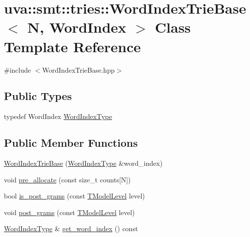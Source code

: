\hypertarget{classuva_1_1smt_1_1tries_1_1_word_index_trie_base}{}\section{uva\+:\+:smt\+:\+:tries\+:\+:Word\+Index\+Trie\+Base$<$ N, Word\+Index $>$ Class Template Reference}
\label{classuva_1_1smt_1_1tries_1_1_word_index_trie_base}


{\ttfamily \#include $<$Word\+Index\+Trie\+Base.\+hpp$>$}

\subsection*{Public Types}
\begin{DoxyCompactItemize}
\item 
typedef Word\+Index \hyperlink{classuva_1_1smt_1_1tries_1_1_word_index_trie_base_a30c4fffe3a3423c87b229b66340dd2f8}{Word\+Index\+Type}
\end{DoxyCompactItemize}
\subsection*{Public Member Functions}
\begin{DoxyCompactItemize}
\item 
\hyperlink{classuva_1_1smt_1_1tries_1_1_word_index_trie_base_afd4bb660c032fbf012fac98fa89d10f6}{Word\+Index\+Trie\+Base} (\hyperlink{classuva_1_1smt_1_1tries_1_1_word_index_trie_base_a30c4fffe3a3423c87b229b66340dd2f8}{Word\+Index\+Type} \&word\+\_\+index)
\item 
void \hyperlink{classuva_1_1smt_1_1tries_1_1_word_index_trie_base_a7481d7ffb51e7f7da90402a1c0ff5cb8}{pre\+\_\+allocate} (const size\+\_\+t counts\mbox{[}N\mbox{]})
\item 
bool \hyperlink{classuva_1_1smt_1_1tries_1_1_word_index_trie_base_a6f4a5a898fc21351a2f41ff951fa4aea}{is\+\_\+post\+\_\+grams} (const \hyperlink{namespaceuva_1_1smt_1_1tries_a20577a44b3a42d26524250634379b7cb}{T\+Model\+Level} level)
\item 
void \hyperlink{classuva_1_1smt_1_1tries_1_1_word_index_trie_base_af2e97e26840915382281d6e13eaef383}{post\+\_\+grams} (const \hyperlink{namespaceuva_1_1smt_1_1tries_a20577a44b3a42d26524250634379b7cb}{T\+Model\+Level} level)
\item 
\hyperlink{classuva_1_1smt_1_1tries_1_1_word_index_trie_base_a30c4fffe3a3423c87b229b66340dd2f8}{Word\+Index\+Type} \& \hyperlink{classuva_1_1smt_1_1tries_1_1_word_index_trie_base_ab284125ce75939a6812a0fb2b699a953}{get\+\_\+word\+\_\+index} () const 
\end{DoxyCompactItemize}
